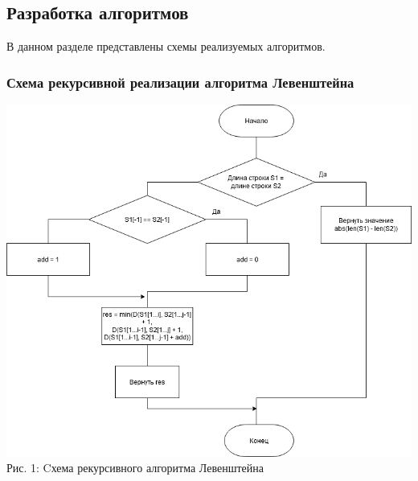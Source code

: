 \documentclass[12pt,a4paper]{article}
\begin{document}
\subsection{Разработка алгоритмов} %
В данном разделе представлены схемы реализуемых алгоритмов.
\subsubsection{Схема рекурсивной реализации алгоритма Левенштейна}
\begin{center}	
	\includegraphics[width=0.9\linewidth]{lev_rec}\\
	Рис. 1: Cхема рекурсивного алгоритма Левенштейна
\end{center}
\clearpage
\end{document}
